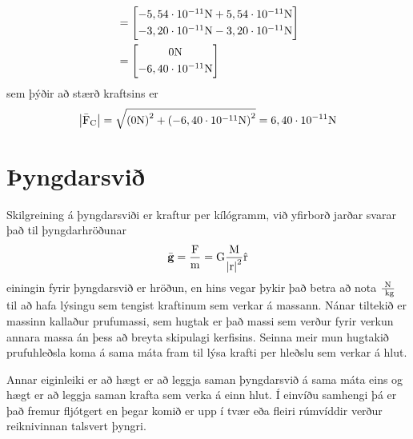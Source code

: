 \begin{formalexample}
\begin{align*}
		&= 
		\begin{bmatrix}
			- 5,54 \cdot 10^{-11} \textrm{N} + 5,54 \cdot 10^{-11} \textrm{N} \\[0.3em]
			- 3,20 \cdot 10^{-11} \textrm{N} - 3,20 \cdot 10^{-11}  \textrm{N}
		\end{bmatrix}\\
		&= 
		\begin{bmatrix}
			0 \textrm{N} \\[0.3em]
			- 6,40 \cdot 10^{-11} \textrm{N}
		\end{bmatrix}
\end{align*}
sem þýðir að stærð kraftsins er
\[
	\left|\bar{\textrm{F}}_\text{C} \right| 
		= \sqrt{\left(0 \textrm{N}\right)^2 + \left(-6,40 \cdot 10^{-11} \textrm{N}\right)^2}
		= 6,40 \cdot 10^{-11} \textrm{N}
\]
\end{formalexample}


\section{Þyngdarsvið}
Skilgreining á þyngdarsviði er kraftur per kílógramm, við yfirborð jarðar svarar
það til þyngdarhröðunar
\begin{equation}
	\bar{\textbf{g}} =  \frac{\textrm{F}}{\textrm{m}} 
		= \text{G} \frac{\textrm{M}}{\left|\textrm{r}\right|^2} \hat {\textrm{r}}
\end{equation}
einingin fyrir þyngdarsvið er hröðun, en hins vegar þykir það betra að nota
$\frac{\textrm{N}}{\textrm{ k}\textrm{g}}$ til að hafa lýsingu sem tengist kraftinum sem
verkar á massann. Nánar tiltekið er massinn kallaður prufumassi, sem hugtak er
það massi sem verður fyrir verkun annara massa án þess að breyta
skipulagi kerfisins. Seinna meir mun hugtakið prufuhleðsla koma á sama máta
fram til lýsa krafti per hleðslu sem verkar á hlut.

Annar eiginleiki er að hægt er að leggja saman þyngdarsvið á sama máta eins
og hægt er að leggja saman krafta sem verka á einn hlut. Í einvíðu samhengi
þá er það fremur fljótgert en þegar komið er upp í tvær eða fleiri
rúmvíddir verður reiknivinnan talsvert þyngri.

